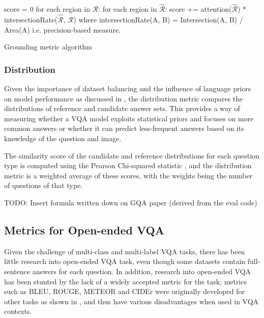 score = 0
for each region in \(\mathcal{R}\):
    for each region in \(\hat{\mathcal{R}}\):
        score += attention(\(\hat{\mathcal{R}}\)) * intersectionRate(\(\hat{\mathcal{R}}\), \(\mathcal{R}\))
        where intersectionRate(A, B) = Intersection(A, B) / Area(A) i.e. precision-based measure.


\begin{algorithm}[htbp]
    \caption[Grounding metric algorithm]{Grounding metric algorithm}
    \label{algorithm:grounding}
\end{algorithm}

\subsubsection{Distribution}

Given the importance of dataset balancing and the influence of language priors on model performance as discussed in \sectionautorefname{ \ref{section:vqa_datasets}}, the distribution metric compares the distributions of reference and candidate answer sets. This provides a way of measuring whether a VQA model exploits statistical priors and focuses on more common answers or whether it can predict less-frequent answers based on its knowledge of the question and image.

The similarity score of the candidate and reference distributions for each question type is computed using the Pearson Chi-squared statistic \cite{pearson1900x}, and the distribution metric is a weighted average of these scores, with the weights being the number of questions of that type.

{\color{red} TODO: Insert formula written down on GQA paper (derived from the eval code)}

\subsection{Metrics for Open-ended VQA}
\label{subsection:open_ended_vqa_metrics}

Given the challenge of multi-class and multi-label VQA tasks, there has been little research into open-ended VQA task, even though some datasets contain full-sentence answers for each question. In addition, research into open-ended VQA has been stunted by the lack of a widely accepted metric for the task; metrics such as BLEU,  ROUGE, METEOR and CIDEr were originally developed for other tasks as shown in \tableautorefname{ \ref{tab:vqa_metrics_comparison}}, and thus have various disadvantages when used in VQA contexts.

